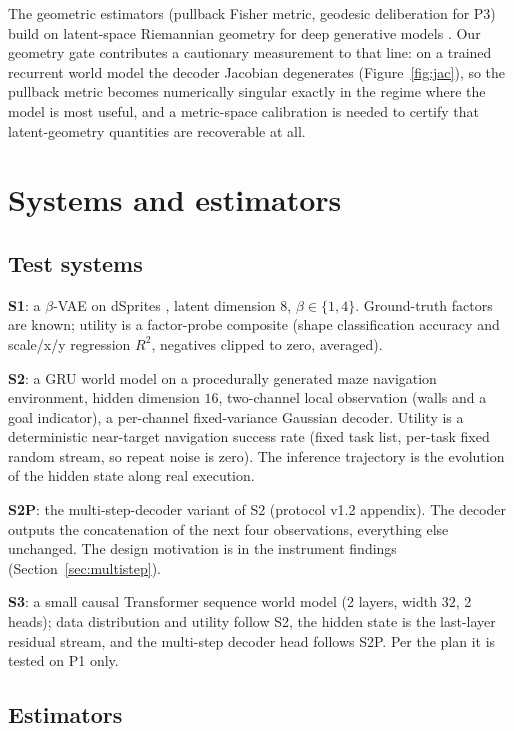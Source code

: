 \documentclass{article}
\begin{document}
The geometric estimators (pullback Fisher metric, geodesic deliberation for P3)
build on latent-space Riemannian geometry for deep generative models
\citep{arvanitidis2018oddity, shao2018riemannian}. Our geometry gate contributes a
cautionary measurement to that line: on a trained recurrent world model the
decoder Jacobian degenerates (Figure~\ref{fig:jac}), so the pullback metric
becomes numerically singular exactly in the regime where the model is most useful,
and a metric-space calibration is needed to certify that latent-geometry
quantities are recoverable at all.

\section{Systems and estimators}

\subsection{Test systems}

\textbf{S1}: a $\beta$-VAE \citep{higgins2017betavae,kingma2014vae} on dSprites
\citep{dsprites}, latent dimension $8$, $\beta\in\{1,4\}$. Ground-truth factors
are known; utility is a factor-probe composite (shape classification accuracy
and scale/x/y regression $R^2$, negatives clipped to zero, averaged).

\textbf{S2}: a GRU world model on a procedurally generated maze navigation
environment, hidden dimension $16$, two-channel local observation (walls and a
goal indicator), a per-channel fixed-variance Gaussian decoder. Utility is a
deterministic near-target navigation success rate (fixed task list, per-task
fixed random stream, so repeat noise is zero). The inference trajectory is the
evolution of the hidden state along real execution.

\textbf{S2P}: the multi-step-decoder variant of S2 (protocol v1.2 appendix). The
decoder outputs the concatenation of the next four observations, everything else
unchanged. The design motivation is in the instrument findings
(Section~\ref{sec:multistep}).

\textbf{S3}: a small causal Transformer sequence world model (2 layers, width
$32$, 2 heads); data distribution and utility follow S2, the hidden state is the
last-layer residual stream, and the multi-step decoder head follows S2P. Per the
plan it is tested on P1 only.

\subsection{Estimators}
\end{document}
